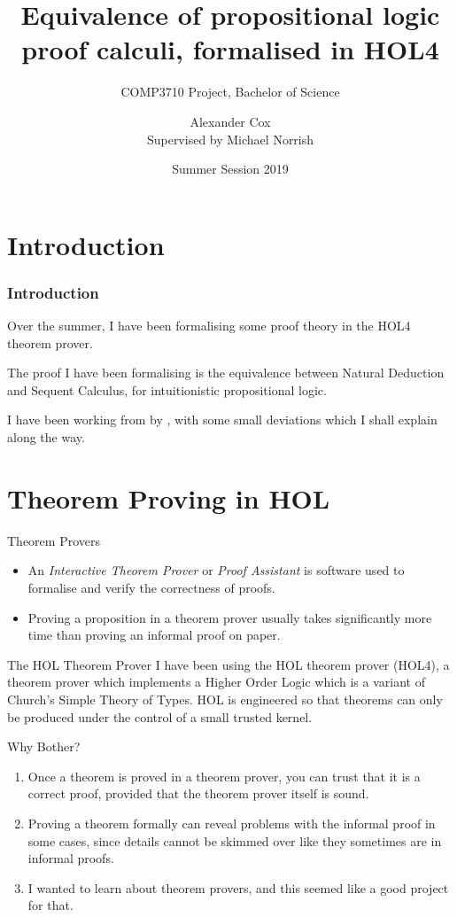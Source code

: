\documentclass[english,svgnames,hide notes,12pt]{beamer}
\title[Equivalence of calculi in HOL4]{Equivalence of propositional logic proof calculi, formalised in HOL4}
\subtitle{COMP3710 Project, Bachelor of Science}
\author[Alexander Cox]{\large Alexander Cox\\ \small Supervised by Michael Norrish}
\institute[ANU]{The Australian National University}
\date[Summer 2019]{Summer Session 2019}
\theoremstyle{definition}
\theoremstyle{remark}
\begin{document}
\begin{frame}[plain]
    \titlepage{}
\end{frame}

\section{Introduction}

\begin{frame}
    \frametitle{Introduction}
    Over the summer, I have been formalising some proof theory in the HOL4 theorem prover.

    \bigskip
    The proof I have been formalising is the equivalence between Natural Deduction and Sequent Calculus, for intuitionistic propositional logic.

    \bigskip
    I have been working from  by \citeauthor{bpt}, with some small deviations which I shall explain along the way.
\end{frame}

\section{Theorem Proving in HOL}

\begin{frame}{Theorem Provers}
    \begin{itemize}
        \item An \emph{Interactive Theorem Prover} or \emph{Proof Assistant} is software used to formalise and verify the correctness of proofs.
        \item Proving a proposition in a theorem prover usually takes significantly more time than proving an informal proof on paper.
    \end{itemize}
\end{frame}

\begin{frame}{The HOL Theorem Prover}
  I have been using the HOL theorem prover (HOL4), a theorem prover which implements a Higher Order Logic which is a variant of Church's Simple Theory of Types.
  HOL is engineered so that theorems can only be produced under the control of a small trusted kernel.
\end{frame}

\begin{frame}{Why Bother?}
    \begin{enumerate}
        \item Once a theorem is proved in a theorem prover, you can trust that it is a correct proof, provided that the theorem prover itself is sound.
        \item Proving a theorem formally can reveal problems with the informal proof in some cases, since details cannot be skimmed over like they sometimes are in informal proofs.
        \item I wanted to learn about theorem provers, and this seemed like a good project for that.
    \end{enumerate}
\end{frame}
\end{document}
